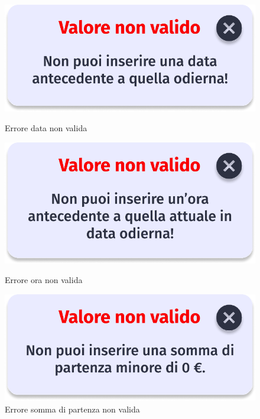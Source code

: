         \begin{figure}[!htb]
            \begin{minipage}{0.32\textwidth}
                \centering
                \includegraphics[width=.7\linewidth]{Immagini/Frames/Popup/P19.pdf}
                \caption{Errore data non valida}
            \end{minipage}\hfill
            \begin{minipage}{0.32\textwidth}
                \centering
                \includegraphics[width=.7\linewidth]{Immagini/Frames/Popup/P14.pdf}
                \caption{Errore ora non valida}
            \end{minipage}\hfill
            \begin{minipage}{0.32\textwidth}
                \centering
                \includegraphics[width=.7\linewidth]{Immagini/Frames/Popup/P10.pdf}
                \caption{Errore somma di partenza non valida}
            \end{minipage}\hfill
        \end{figure}
    
